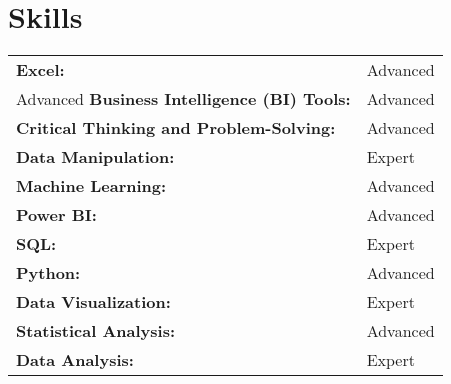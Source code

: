 \documentclass[a4paper,12pt]{article}
\begin{document}
\section{Skills}
\begin{tabularx}{\linewidth}{@{}l X@{}}

\textbf{Excel:}& \hfill Advanced \\ Advanced
\textbf{Business Intelligence (BI) Tools:} & \hfill Advanced \\
\textbf{Critical Thinking and Problem-Solving:} & \hfill Advanced \\
\textbf{Data Manipulation:} & \hfill Expert \\
\textbf{Machine Learning:} & \hfill Advanced \\
\textbf{Power BI:}  & \hfill  Advanced \\
\textbf{SQL:}& \hfill Expert \\
\textbf{Python:} & \hfill Advanced \\
\textbf{Data Visualization:} & \hfill Expert \\
\textbf{Statistical Analysis:} & \hfill Advanced \\
\textbf{Data Analysis:} & \hfill Expert \\
\end{tabularx}

\vfill
{}
\end{document}
